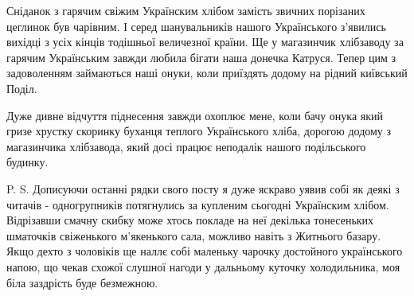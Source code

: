 Сніданок з гарячим свіжим Українским хлібом замість звичних порізаних цеглинок
був чарівним. І серед шанувальників нашого Українського з'явились вихідці з
усіх кінців тодішньої величезної країни. Ще у магазинчик хлібзаводу за гарячим
Українським завжди любила бігати наша донечка Катруся. Тепер цим з задоволенням
займаються наші онуки, коли приїздять додому на рідний київський Поділ. 

Дуже дивне відчуття піднесення завжди охоплює мене, коли бачу онука який гризе
хрустку скоринку буханця теплого Українського хліба, дорогою додому з
магазинчика хлібзавода, який досі працює неподалік нашого подільського будинку. 

P. S. Дописуючи останні рядки свого посту я дуже яскраво уявив собі як деякі з
читачів - одногрупників потягнулись за купленим сьогодні Українским хлібом.
Відрізавши смачну скибку може хтось покладе на неї декілька тонесеньких
шматочків свіженького м'якенького сала, можливо навіть з Житнього базару.
Якщо дехто з чоловіків ще наллє собі маленьку чарочку достойного українського
напою, що чекав схожої слушної нагоди у дальньому куточку холодильника, моя
біла заздрість буде безмежною.

